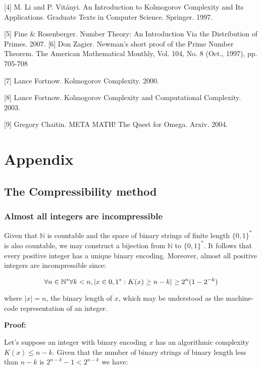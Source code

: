 \documentclass{article}
\begin{document}
[4] M. Li and P. Vitányi. An Introduction to Kolmogorov Complexity and Its Applications. Graduate Texts in Computer Science. Springer. 1997.

[5] Fine & Rosenberger. Number Theory: An Introduction Via the Distribution of Primes. 2007.
[6] Don Zagier. Newman’s short proof of the Prime Number Theorem. The American Mathematical Monthly, Vol. 104, No. 8 (Oct., 1997), pp. 705-708

[7] Lance Fortnow. Kolmogorov Complexity. 2000.

[8] Lance Fortnow. Kolmogorov Complexity and Computational Complexity. 2003.

[9] Gregory Chaitin. META MATH! The Quest for Omega. Arxiv. 2004.

\newpage

\section{Appendix}

\subsection{The Compressibility method}

\subsubsection{Almost all integers are incompressible}

Given that $\mathbb{N}$ is countable and the space of binary strings of finite length $\{0,1\}^*$
is also countable, we may construct a bijection from $\mathbb{N}$ to $\{0,1\}^*$. It follows
that every positive integer has a unique binary encoding. Moreover, almost all positive integers are incompressible since:

\begin{equation}
\forall n \in \mathbb{N}^* \forall k < n, |\\{x \in \\{0,1\\}^*:K(x) \geq n -k \\}| \geq 2^n(1-2^{-k})
\end{equation}

where $|x| = n$, the binary length of $x$, which may be understood as the machine-code representation
of an integer.

\textbf{Proof:}

Let's suppose an integer with binary encoding $x$ has an algorithmic complexity $K(x) \leq n-k$.
Given that the number of binary strings of binary length less than $n-k$ is $2^{n-k} - 1 < 2^{n-k}$ we have:
\end{document}
